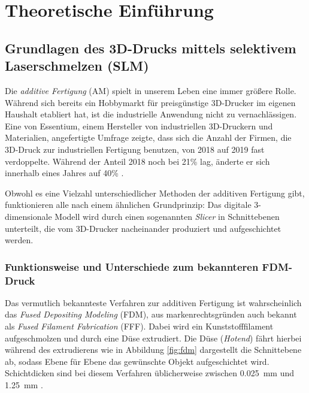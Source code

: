 \chapter{Theoretische Einführung}



\section{Grundlagen des 3D-Drucks mittels selektivem Laserschmelzen (SLM)}
	Die \emph{additive Fertigung} (AM) spielt in unserem Leben eine immer größere Rolle. Während
	sich bereits ein Hobbymarkt für preisgünstige 3D-Drucker im eigenen Haushalt etabliert hat,
	ist die industrielle Anwendung nicht zu vernachlässigen. Eine von Essentium, einem Hersteller
	von industriellen 3D-Druckern und Materialien, angefertigte Umfrage zeigte, dass sich die
	Anzahl der Firmen, die 3D-Druck zur industriellen Fertigung benutzen, von 2018 auf 2019 fast
	verdoppelte. Während der Anteil 2018 noch bei 21\% lag, änderte er sich innerhalb eines Jahres
	auf 40\% \cite{stevenson2019survey}.

	Obwohl es eine Vielzahl unterschiedlicher Methoden der additiven Fertigung gibt, funktionieren
	alle nach einem ähnlichen Grundprinzip: Das digitale 3-dimension\-ale Modell wird durch einen
	sogenannten \emph{Slicer} in Schnittebenen unterteilt, die vom 3D-Drucker nacheinander
	produziert und aufgeschichtet werden.

	\subsection{Funktionsweise und Unterschiede zum bekannteren FDM-Druck}
		Das vermutlich bekannteste Verfahren zur additiven Fertigung ist wahrscheinlich das
		\emph{Fused Depositing Modeling} (FDM), aus markenrechtsgründen auch bekannt als
		\emph{Fused Filament Fabrication} (FFF). Dabei wird ein Kunststofffilament aufgeschmolzen
		und durch eine Düse extrudiert. Die Düse (\emph{Hotend}) fährt hierbei während des
		extrudierens wie in Abbildung \ref{fig:fdm} dargestellt die Schnittebene ab, sodass
		Ebene für Ebene das gewünschte Objekt aufgeschichtet wird. Schichtdicken sind bei diesem
		Verfahren üblicherweise zwischen \SI{0,025}{\milli\meter} und \SI{1,25}{\milli\meter}
		\cite{wikipedia2021fused}.


